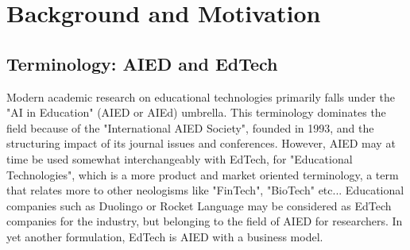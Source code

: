 \section{Background and Motivation}
    \subsection{Terminology: AIED and EdTech}
Modern academic research on educational technologies primarily falls under the "AI in Education" (AIED or AIEd) umbrella. This terminology dominates the field because of the "International AIED Society", founded in 1993, and the structuring impact of its journal issues and conferences. However, AIED may at time be used somewhat interchangeably with EdTech, for "Educational Technologies", which is a more product and market oriented terminology, a term that relates more to other neologisms like "FinTech", "BioTech" etc... Educational companies such as Duolingo or Rocket Language may be considered as EdTech companies for the industry, but belonging to the field of AIED for researchers. In yet another formulation, EdTech is AIED with a business model.

